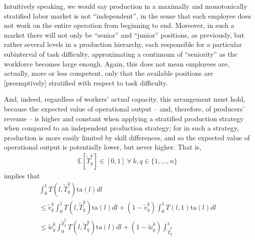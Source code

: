 \documentclass[hidelinks, nonatbib]{elsarticle}
\begin{document}
\begin{enumerate}
\begin{enumerate}
\begin{enumerate}
            Intuitively speaking, we would say production in a maximally and monotonically stratified labor market is not ``independent'', in the sense that each employee does not work on the entire operation from beginning to end. Moreover, in such a market there will not only be ``senior'' and ``junior'' positions, as previously, but rather several levels in a production hierarchy, each responsible for a particular subinterval of task difficulty, approximating a continuum of ``seniority'' as the workforce becomes large enough. Again, this does not mean employees are, actually, more or less competent, only that the available positions are [preemptively] stratified with respect to task difficulty. 

            And, indeed, regardless of workers' actual capacity, this arrangement must hold, because the expected value of operational output -- and, therefore, of producers' revenue -- is higher and constant when applying a stratified production strategy when compared to an independent production strategy; for in such a strategy, production is more easily limited by skill differences, and so the expected value of operational output is potentially lower, but never higher. That is, 
            \begin{gather}
                \mathbb{E}[
                    \tilde{T}_{q}^{k}
                ]
                \in [0,1]
                \
                \forall
                \
                k,q \in \{1, \dots, n\}
            \end{gather}
            implies that
            \begin{align}
                \int_{0}^{1}{
                    T(l,\tilde{T}_{q}^{k})
                    \text{ta}(l)
                    dl
                } 
                \\
                \leq
                \tilde{v}_{q}^{k}
                \int_{0}^{1}{
                    T(l,\tilde{T}_{q}^{k})
                    \text{ta}(l)
                    dl
                }
                +
                (1 - \tilde{v}_{q}^{k})
                \int_{0}^{1}{
                    T(l,1)
                    \text{ta}(l)
                    dl
                } 
                \\
                \leq
                \tilde{w}_{q}^{k}
                \int_{0}^{\tilde{T}_{q}^{k}}{
                    T(l,\tilde{T}_{q}^{k})
                    \text{ta}(l)
                    dl
                } + 
                (1 - \tilde{w}_{q}^{k})
                \int_{\tilde{T}_{q}^{k}}^{1}{
}
\end{align}
\end{enumerate}
\end{enumerate}
\end{enumerate}
\end{document}
